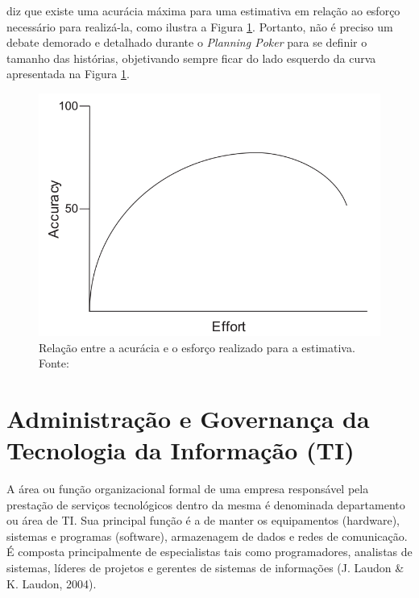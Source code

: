      diz que existe uma acurácia máxima para uma estimativa
    em relação ao esforço necessário para realizá-la, como ilustra a Figura \ref{fig:effort_accuracy}.
    Portanto, não é preciso um debate demorado e detalhado durante o \textit{Planning Poker} para se definir
    o tamanho das histórias, objetivando sempre ficar do lado esquerdo da curva apresentada na Figura \ref{fig:effort_accuracy}.



    \begin{figure}[!htb]
      \centering
      \includegraphics[scale=0.4]{figuras/effort_accuracy}
      \caption[Relação entre a acurácia e o esforço realizado para a estimativa.]
	      {Relação entre a acurácia e o esforço realizado para a estimativa. Fonte: \cite{cohn06}}
      \label{fig:effort_accuracy}
    \end{figure}



  \section{Administração e Governança da Tecnologia da Informação (TI)}

    A área ou função organizacional formal de uma empresa responsável pela prestação de serviços tecnológicos dentro da mesma é denominada departamento ou área de TI. Sua principal função é a de manter os equipamentos (hardware), sistemas e programas (software), armazenagem de dados e redes de comunicação. É composta principalmente de especialistas tais como programadores, analistas de sistemas, líderes de projetos e gerentes de sistemas de informações (J. Laudon \& K. Laudon, 2004).

